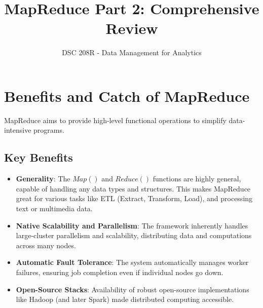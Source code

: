 \documentclass{article}
\title{MapReduce Part 2: Comprehensive Review}
\author{DSC 208R - Data Management for Analytics}
\date{}
\begin{document}
\maketitle

\section*{Benefits and Catch of MapReduce}
MapReduce aims to provide high-level functional operations to simplify data-intensive programs.

\subsection*{Key Benefits}
\begin{itemize}
    \item \textbf{Generality}: The $Map()$ and $Reduce()$ functions are highly general, capable of handling any data types and structures. This makes MapReduce great for various tasks like ETL (Extract, Transform, Load), and processing text or multimedia data.
    \item \textbf{Native Scalability and Parallelism}: The framework inherently handles large-cluster parallelism and scalability, distributing data and computations across many nodes.
    \item \textbf{Automatic Fault Tolerance}: The system automatically manages worker failures, ensuring job completion even if individual nodes go down.
    \item \textbf{Open-Source Stacks}: Availability of robust open-source implementations like Hadoop (and later Spark) made distributed computing accessible.
\end{itemize}
\end{document}
